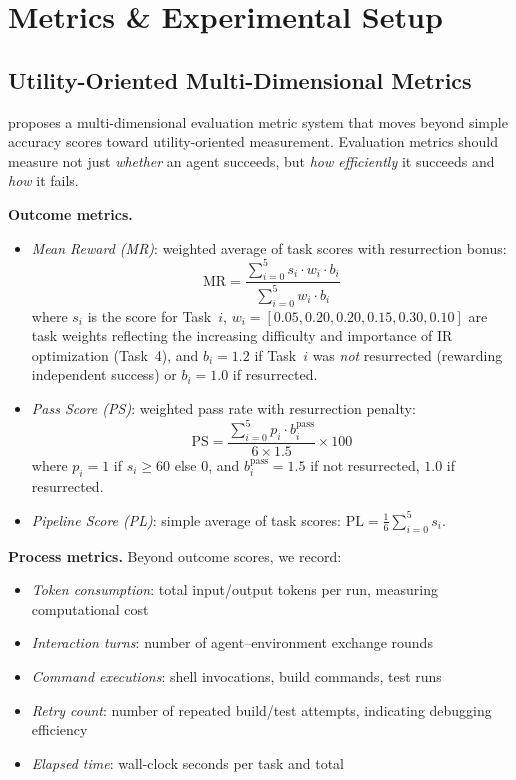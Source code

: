 \section{Metrics \& Experimental Setup}

\subsection{Utility-Oriented Multi-Dimensional Metrics}

\eva{} proposes a multi-dimensional evaluation metric system that moves beyond simple accuracy scores toward utility-oriented measurement.
Evaluation metrics should measure not just \emph{whether} an agent succeeds, but \emph{how efficiently} it succeeds and \emph{how} it fails.

\textbf{Outcome metrics.}
\begin{itemize}[nosep]
\item \emph{Mean Reward (MR)}: weighted average of task scores with resurrection bonus:
\[
\text{MR} = \frac{\sum_{i=0}^{5} s_i \cdot w_i \cdot b_i}{\sum_{i=0}^{5} w_i \cdot b_i}
\]
where $s_i$ is the score for Task~$i$, $w_i = [0.05, 0.20, 0.20, 0.15, 0.30, 0.10]$ are task weights reflecting the increasing difficulty and importance of IR optimization (Task~4), and $b_i = 1.2$ if Task~$i$ was \emph{not} resurrected (rewarding independent success) or $b_i = 1.0$ if resurrected.

\item \emph{Pass Score (PS)}: weighted pass rate with resurrection penalty:
\[
\text{PS} = \frac{\sum_{i=0}^{5} p_i \cdot b_i^{\text{pass}}}{6 \times 1.5} \times 100
\]
where $p_i = 1$ if $s_i \geq 60$ else $0$, and $b_i^{\text{pass}} = 1.5$ if not resurrected, $1.0$ if resurrected.

\item \emph{Pipeline Score (PL)}: simple average of task scores: $\text{PL} = \frac{1}{6}\sum_{i=0}^{5} s_i$.
\end{itemize}

\textbf{Process metrics.}
Beyond outcome scores, we record:
\begin{itemize}[nosep]
\item \emph{Token consumption}: total input/output tokens per run, measuring computational cost
\item \emph{Interaction turns}: number of agent--environment exchange rounds
\item \emph{Command executions}: shell invocations, build commands, test runs
\item \emph{Retry count}: number of repeated build/test attempts, indicating debugging efficiency
\item \emph{Elapsed time}: wall-clock seconds per task and total
\end{itemize}


